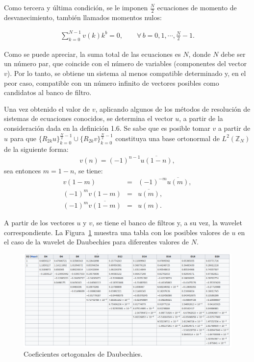 \par Como tercera y \'ultima condici\'on, se le imponen $\frac{N}{2}$ ecuaciones de momento de desvanecimiento, tambi\'en llamados momentos nulos:

\begin{eqnarray}
\sum_{k=0}^{N-1}v(k)k^b=0,\qquad\forall\,b=0,1,\cdots,\frac{N}{2}-1.
\label{momento-nulo}
\end{eqnarray}

\par Como se puede apreciar, la suma total de las ecuaciones es $N$, donde $N$ debe ser un n\'umero par, que coincide con el n\'umero de variables (componentes del vector $v$). Por lo tanto, se obtiene un sistema al menos compatible determinado y, en el peor caso, compatible con un n\'umero infinito de vectores posibles como candidatos al banco de filtro.

\par Una vez obtenido el valor de $v$, aplicando algunos de los m\'etodos de resoluci\'on de sistemas de ecuaciones conocidos, se determina el vector $u$, a partir de la consideraci\'on dada en la definici\'on 1.6. Se sabe que es posible tomar $v$ a partir de $u$ para que $\{R_{2k}u\}_{k=0}^{\frac{N}{2}-1} \cup \{R_{2k}v\}_{k=0}^{\frac{N}{2}-1}$ constituya una base ortonormal de $L^2(\mathbb{Z}_N)$ de la siguiente forma:
\begin{eqnarray}
v(n)=(-1)^{n-1}\overline{u(1-n)},\nonumber
\end{eqnarray}
sea entonces $m=1-n$, se tiene:
\begin{eqnarray}
v(1-m)&=&(-1)^{-m}\overline{u(m)},\nonumber\\
(-1)^{m}v(1-m)&=&\overline{u(m)},\nonumber\\
(-1)^{m}\overline{v(1-m)}&=&u(m).\nonumber
\end{eqnarray}

\par A partir de los vectores $u$ y $v$, se tiene el banco de filtros y, a su vez, la wavelet correspondiente. La Figura~\ref{coef-daubechies} muestra una tabla con los posibles valores de $u$ en el caso de la wavelet de Daubechies para diferentes valores de $N$.

\begin{figure}[h]
\center
\includegraphics[scale=.35]{Graphics/Daubechies.png}
\caption{Coeficientes ortogonales de Daubechies.}
\label{coef-daubechies}
\end{figure}

